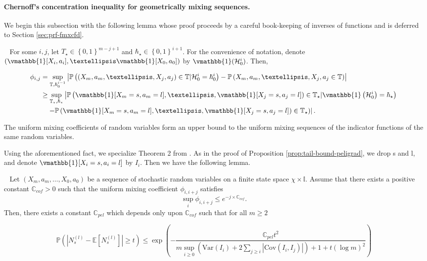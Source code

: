 \documentclass[opre,sglanonrev]{informs4}
\numberwithin{equation}{section}
\newcommand{\pow}[1]{^{(#1)}}
\newcommand{\lp}{\left(}
\newcommand{\rp}{\right)}
\newcommand{\lc}{\left\{}
\newcommand{\rc}{\right\}}
\newcommand{\lv}{\left|}
\newcommand{\rv}{\right|}
\newcommand{\Var}{\mathrm{Var}}
\newcommand{\Cov}{\mathrm{Cov}}
\newcommand{\History}{\mathcal{H}}
\newcommand{\history}{\hbar}
\newcommand{\Cbb}{\mathbb{C}}
\newcommand{\Ibb}{\mathbb{I}}
\newcommand{\Pbb}{\mathbb{P}}
\newcommand{\Tbb}{\mathbb{T}}
\newcommand{\constant}{\Cbb}
\newcommand{\prob}{\Pbb}
\newcommand{\expec}{\mathbb{E}}
\newcommand{\indicator}{\vmathbb{1}}
\begin{document}
\begin{APPENDICES}
{   
\paragraph{Chernoff's concentration inequality for geometrically mixing sequences.} We begin this subsection with the following lemma whose proof proceeds by a careful book-keeping of inverses of functions and is deferred to Section \ref{sec:prf-fmxcfd}.
\begin{lemma}~\label{lemma:funcmix-coefbd}
For some $i,j$, let $T_\star\in\lc0,1\rc^{m-j+1}$ and $\history_\star\in\lc0,1\rc^{i+1}$. For the convenience of notation, denote $\lp\indicator[X_i,a_i],\dots \indicator[X_0,a_0]\rp$ by $\indicator(\History_0^i)$. Then,
\begin{small}
\begin{align*}
    \phi_{i,j} & = \sup_{\substack{\Tbb,\history_0^{i-1}}}\left|\prob\left((X_m,a_m,\dots, X_j,a_j)\in \mathbb{T}|\History_0^{i}=\history_0^{i}\right)-\prob\left(X_m,a_m,\dots,X_j,a_j\in\mathbb{T}\right)\right|\\
    & \geq \sup_{\substack{\Tbb_\star,\history_\star}}\left|\prob\left(\indicator[X_m=s,a_m=l],\dots, \indicator[X_j=s,a_j=l])\in \mathbb{T}_\star|\indicator\lp\History_0^{i}\rp=\history_\star\right)\right.\\
    & \quad \left.-\prob\lp\indicator[X_m=s,a_m=l],\dots, \indicator[X_j=s,a_j=l])\in \mathbb{T}_\star\rp\right|.
\end{align*}
\end{small}
\end{lemma}
\begin{remark}
The uniform mixing coefficients of random variables form an upper bound to the uniform mixing sequences of the indicator functions of the same random variables. 
\end{remark}
Using the aforementioned fact, we specialize Theorem 2 from \cite{merlevede2009bernstein}. 
As in the proof of Proposition \ref{prop:tail-bound-peligrad}, we drop s and l, and denote $\indicator[X_i=s,a_i=l]$ by $I_{i}$. Then we have the following lemma.
\begin{lemma}~\label{lemma:peligrad}
Let $(X_m,a_m,\dots,X_0,a_0)$ be a sequence of stochastic random variables on a finite state space $\chi\times\Ibb$. Assume that there exists a positive constant $\constant_{cof}>0$ such that the uniform mixing coefficient $\phi_{i,i+j}$ satisfies 
\[
\sup_{i} \phi_{i,i+j}\leq e^{-j\times \constant_{cof}}.
\]
Then, there exists a constant $\constant_{pel}$ which depends only upon $\constant_{cof}$ such that for all $m\geq 2$
\begin{small}
\begin{equation}
    \prob\lp \lv N_s\pow{l}-\expec[N_s\pow{l}]\rv\geq t \rp\leq \exp\lp-\frac{\constant_{pel}t^2}{m\sup_{i\geq 0}\lp \Var(I_{i}) +2\sum_{j\geq i}|\Cov(I_{i},I_{j})|\rp+1+t(\log m)^2}\rp
\end{equation}
\end{small}


\end{lemma}}
\end{APPENDICES}
\end{document}
